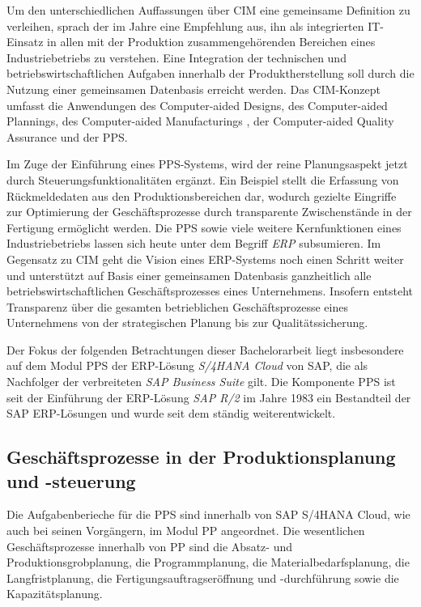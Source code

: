 Um den unterschiedlichen Auffassungen über \ac{CIM} eine gemeinsame Definition zu verleihen, sprach der \citeauthor{AusschufurWirtschaftlicheFertigung.1985} im Jahre \citeyear{AusschufurWirtschaftlicheFertigung.1985} eine Empfehlung aus, ihn als integrierten \ac{IT}-Einsatz in allen mit der Produktion zusammengehörenden Bereichen eines Industriebetriebs zu verstehen. 
Eine Integration der technischen und betriebswirtschaftlichen Aufgaben innerhalb der Produktherstellung soll durch die Nutzung einer gemeinsamen Datenbasis erreicht werden. 
Das \ac{CIM}-Konzept umfasst die Anwendungen des Computer-aided Designs, des Computer-aided Plannings, des Computer-aided Manufacturings , der Computer-aided Quality Assurance und der \ac{PPS}.
\cite{AusschufurWirtschaftlicheFertigung.1985}

Im Zuge der Einführung eines \ac{PPS}-Systems, wird der reine Planungsaspekt jetzt durch Steuerungsfunktionalitäten ergänzt. Ein Beispiel stellt die Erfassung von Rückmeldedaten aus den Produktionsbereichen dar, wodurch gezielte Eingriffe zur Optimierung der Geschäftsprozesse durch transparente Zwischenstände in der Fertigung ermöglicht werden.
\cite{Dickersbach.2014}
Die \ac{PPS} sowie viele weitere Kernfunktionen eines Industriebetriebs lassen sich heute unter dem Begriff \textit{\acf{ERP}} subsumieren. Im Gegensatz zu \ac{CIM} geht die Vision eines \ac{ERP}-Systems noch einen Schritt weiter und unterstützt auf Basis einer gemeinsamen Datenbasis ganzheitlich alle betriebswirtschaftlichen Geschäftsprozesses eines Unternehmens.
Insofern entsteht Transparenz über die gesamten betrieblichen Geschäftsprozesse eines Unternehmens von der strategischen Planung bis zur Qualitätssicherung.
\cite{Leiting.2012}

Der Fokus der folgenden Betrachtungen dieser Bachelorarbeit liegt insbesondere auf dem Modul \ac{PPS} der \ac{ERP}-Lösung \textit{S/4HANA Cloud} von SAP, die als Nachfolger der verbreiteten \textit{SAP Business Suite} gilt. 
\cite{Densborn.2018}
Die Komponente \ac{PPS} ist seit der Einführung der \ac{ERP}-Lösung \textit{SAP R/2} im Jahre 1983 ein Bestandteil der SAP \ac{ERP}-Lösungen und wurde seit dem ständig weiterentwickelt.
\cite{Frick.2008}

\subsection{Geschäftsprozesse in der Produktionsplanung und -steuerung}
Die Aufgabenberieche für die \ac{PPS} sind innerhalb von SAP S/4HANA Cloud, wie auch bei seinen Vorgängern, im Modul PP angeordnet. Die wesentlichen Geschäftsprozesse innerhalb von PP sind die Absatz- und Produktionsgrobplanung, die Programmplanung, die Materialbedarfsplanung, die Langfristplanung, die Fertigungsauftragseröffnung und -durchführung sowie die Kapazitätsplanung. 
\cite{Akhtar.2019} 

